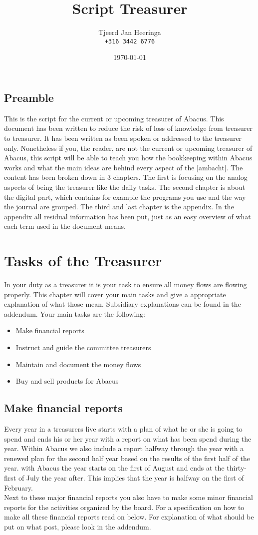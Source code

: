 \documentclass{report}
\title{Script Treasurer}
\author{Tjeerd Jan Heeringa\\
	\texttt{+316 3442 6776}	
}
\date{\today}
\newcommand{\mychapter}[2]{
    \setcounter{chapter}{#1}
    \setcounter{section}{0}
    \chapter*{#2}
    \addcontentsline{toc}{chapter}{#2}
}
\begin{document}
\maketitle
\section*{Preamble}
This is the script for the current or upcoming treasurer of Abacus. This document has been written to reduce the risk of loss of knowledge from treasurer to treasurer. It has been written as been spoken or addressed to the treasurer only. Nonetheless if you, the reader, are not the current or upcoming treasurer of Abacus, this script will be able to teach you how the bookkeeping within Abacus works and what the main ideas are behind every aspect of the [ambacht]. The content has been broken down in 3 chapters. The first is focusing on the analog aspects of being the treasurer like the daily tasks. The second chapter is about the digital part, which contains for example the programs you use and the way the journal are grouped. The third and last chapter is the appendix. In the appendix all residual information has been put, just as an easy overview of what each term used in the document means.       

\tableofcontents

\mychapter{1}{Tasks of the Treasurer}
In your duty as a treasurer it is your task to ensure all money flows are flowing properly. This chapter will cover your main tasks and give a appropriate explanation of what those mean. Subsidiary explanations can be found in the addendum. Your main tasks are the following:
\begin{itemize} 
\vspace{-1mm}
\itemsep-1mm
\item Make financial reports
\item Instruct and guide the committee treasurers
\item Maintain and document the money flows
\item Buy and sell products for Abacus
\end{itemize}


\section{Make financial reports}
Every year in a treasurers live starts with a plan of what he or she is going to spend and ends his or her year with a report on what has been spend during the year. Within Abacus we also include a report halfway through the year with a renewed plan for the second half year based on the results of the first half of the year. with Abacus the year starts on the first of August and ends at the thirty-first of July the year after. This implies that the year is halfway on the first of February. \\
Next to these major financial reports you also have to make some minor financial reports for the activities organized by the board. For a specification on how to make all these financial reports read on below. For explanation of what should be put on what post, please look in the addendum.   
\end{document}

